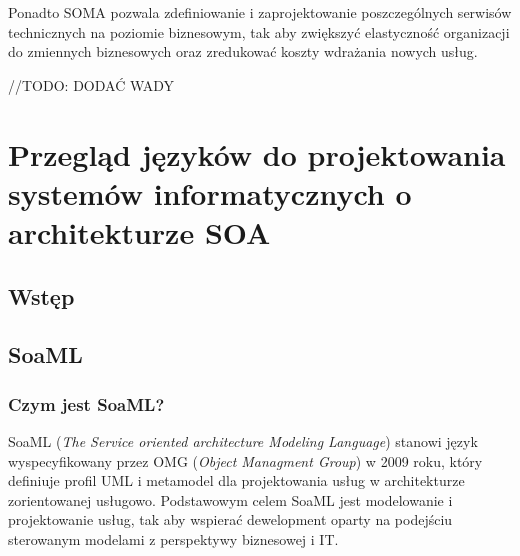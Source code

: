 Ponadto SOMA pozwala zdefiniowanie i zaprojektowanie poszczególnych serwisów technicznych na poziomie biznesowym, tak aby zwiększyć elastyczność organizacji do zmiennych biznesowych oraz zredukować koszty wdrażania nowych usług.

//TODO: DODAĆ WADY

\chapter{Przegląd języków do projektowania systemów informatycznych o architekturze SOA}

\section{Wstęp}

\section{SoaML}
\subsection{Czym jest SoaML?}
SoaML (\emph{The Service oriented architecture Modeling Language}) stanowi język wyspecyfikowany przez OMG (\emph{Object Managment Group}) w 2009 roku, który definiuje profil UML i metamodel dla projektowania usług w architekturze zorientowanej usługowo. Podstawowym celem SoaML jest modelowanie i projektowanie usług, tak aby wspierać dewelopment oparty na podejściu sterowanym modelami z perspektywy biznesowej i IT.

